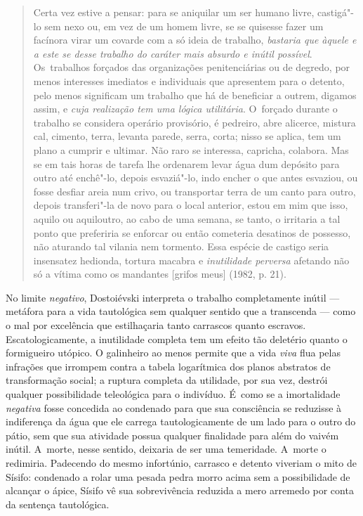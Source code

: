 \begin{quote}
Certa vez estive a pensar: para se aniquilar um ser humano livre,
castigá"-lo sem nexo ou, em vez de um homem livre, se se quisesse fazer
um facínora virar um covarde com a só ideia de trabalho, \emph{bastaria
que àquele e a este se desse trabalho do caráter mais absurdo e inútil
possível}. Os~trabalhos forçados das organizações penitenciárias ou de
degredo, por menos interesses imediatos e individuais que apresentem
para o detento, pelo menos significam um trabalho que há de beneficiar a
outrem, digamos assim, e \emph{cuja realização tem uma lógica
utilitária}. O~forçado durante o trabalho se considera operário
provisório, é pedreiro, abre alicerce, mistura cal, cimento, terra,
levanta parede, serra, corta; nisso se aplica, tem um plano a cumprir e
ultimar. Não raro se interessa, capricha, colabora. Mas se em tais horas
de tarefa lhe ordenarem levar água dum depósito para outro até enchê"-lo,
depois esvaziá"-lo, indo encher o que antes esvaziou, ou fosse desfiar
areia num crivo, ou transportar terra de um canto para outro, depois
transferi"-la de novo para o local anterior, estou em mim que isso,
aquilo ou aquiloutro, ao cabo de uma semana, se tanto, o irritaria a tal
ponto que preferiria se enforcar ou então cometeria desatinos de
possesso, não aturando tal vilania nem tormento. Essa espécie de castigo
seria insensatez hedionda, tortura macabra e \emph{inutilidade perversa}
afetando não só a vítima como os mandantes {[}grifos meus{]} (1982, p.
21).
\end{quote}

No limite \emph{negativo}, Dostoiévski interpreta o trabalho
completamente inútil --- metáfora para a vida tautológica sem qualquer
sentido que a transcenda --- como o mal por excelência que estilhaçaria
tanto carrascos quanto escravos. Escatologicamente, a inutilidade
completa tem um efeito tão deletério quanto o formigueiro utópico. O
galinheiro ao menos permite que a vida \emph{viva} flua pelas infrações
que irrompem contra a tabela logarítmica dos planos abstratos de
transformação social; a ruptura completa da utilidade, por sua vez,
destrói qualquer possibilidade teleológica para o indivíduo. É~como se a
imortalidade \emph{negativa} fosse concedida ao condenado para que sua
consciência se reduzisse à indiferença da água que ele carrega
tautologicamente de um lado para o outro do pátio, sem que sua atividade
possua qualquer finalidade para além do vaivém inútil. A~morte, nesse
sentido, deixaria de ser uma temeridade. A~morte o redimiria. Padecendo
do mesmo infortúnio, carrasco e detento viveriam o mito de Sísifo:
condenado a rolar uma pesada pedra morro acima sem a possibilidade de
alcançar o ápice, Sísifo vê sua sobrevivência reduzida a mero arremedo
por conta da sentença tautológica.

